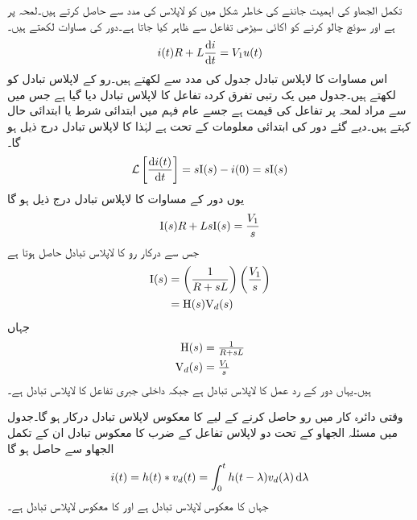 تکمل الجھاو کی اہمیت جاننے کی خاطر  شکل  میں  کو لاپلاس کی مدد سے حاصل کرتے ہیں۔لمحہ  پر  ہے اور سوئچ چالو کرنے کو اکائی سیڑھی تفاعل  سے ظاہر کیا جاتا ہے۔دور کی مساوات لکھتے ہیں۔
\begin{align*}
i(t)R+L\frac{\dif i}{\dif t}=V_1 u(t)
\end{align*}
اس مساوات کا لاپلاس تبادل جدول  کی مدد سے لکھتے ہیں۔رو کے لاپلاس تبادل کو  لکھتے ہیں۔جدول میں یک رتبی تفرق کردہ تفاعل کا لاپلاس تبادل دیا گیا ہے جس میں  سے مراد لمحہ  پر تفاعل کی قیمت ہے جسے عام فہم میں ابتدائی شرط یا ابتدائی حال کہتے ہیں۔دیے گئے دور کی ابتدائی معلومات کے تحت  ہے لہٰذا  کا لاپلاس تبادل درج ذیل ہو گا۔
\begin{align*}
\Laplace\left[\frac{\dif i(t)}{\dif t}\right]=s\bI(s)-i(0)=s\bI(s)
\end{align*} 
یوں دور کے مساوات کا لاپلاس تبادل درج ذیل ہو گا
\begin{align*}
{\ensuremath{{\textup{I}}}}(s)R+Ls{{\textup{I}}}(s)=\frac{V_1}{s}
\end{align*}
جس سے درکار رو کا لاپلاس تبادل حاصل ہوتا ہے
\begin{gather}
\begin{aligned}\label{مساوات_لاپلاس_دور_ردعمل_الف}
{\ensuremath{{\textup{I}}}}(s)&=\left(\frac{1}{R+sL}\right)\left(\frac{V_1}{s}\right)\\
&={{\textup{H}}}(s) {{\textup{V}}}_d(s)
\end{aligned}
\end{gather}
جہاں
\begin{align*}
{\ensuremath{{\textup{H}}}}(s)&=\tfrac{1}{R+sL}\\
{{\textup{V}}}_{d}(s)&=\tfrac{V_1}{s}
\end{align*}
ہیں۔یہاں  دور کے رد عمل کا لاپلاس تبادل ہے جبکہ  داخلی جبری تفاعل کا لاپلاس تبادل ہے۔

وقتی دائرہ کار میں رو  حاصل کرنے کے لیے  کا معکوس لاپلاس تبادل درکار ہو گا۔جدول  میں مسئلہ الجھاو کے تحت دو لاپلاس تفاعل کے ضرب کا معکوس تبادل ان کے تکمل الجھاو سے حاصل ہو گا
\begin{align}\label{مساوات_لاپلاس_دور_ردعمل_ب}
i(t)=h(t) \ast v_d(t)=\int_0^t h(t-\lambda) v_d(\lambda) \dif \lambda
\end{align}
جہاں  کا معکوس لاپلاس تبادل  ہے اور  کا معکوس لاپلاس تبادل  ہے۔


